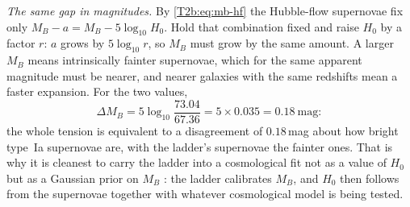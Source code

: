 \emph{The same gap in magnitudes.} By \eqref{T2b:eq:mb-hf} the Hubble-flow supernovae fix only $M_B-a=M_B-5\log_{10}H_0$. Hold that combination fixed and raise $H_0$ by a factor $r$: $a$ grows by $5\log_{10}r$, so $M_B$ must grow by the same amount. A larger $M_B$ means intrinsically fainter supernovae, which for the same apparent magnitude must be nearer, and nearer galaxies with the same redshifts mean a faster expansion. For the two values,
\[
  \Delta M_B=5\log_{10}\frac{73.04}{67.36}=5\times0.035=0.18\ \text{mag}:
\]
the whole tension is equivalent to a disagreement of $0.18$\,mag about how bright type~Ia supernovae are, with the ladder's supernovae the fainter ones. That is why it is cleanest to carry the ladder into a cosmological fit not as a value of $H_0$ but as a Gaussian prior on $M_B$ \cite[Sec.~IV.E, eq.~(1)]{Abdalla2022}: the ladder calibrates $M_B$, and $H_0$ then follows from the supernovae together with whatever cosmological model is being tested.

